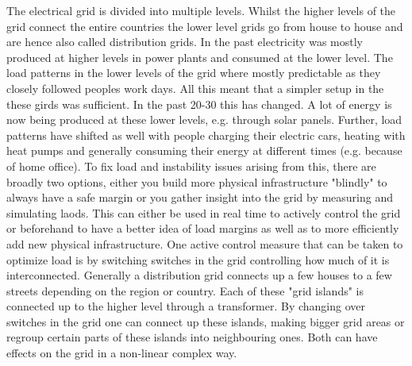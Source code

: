 The electrical grid is divided into multiple levels. Whilst the higher levels of the grid connect
the entire countries the lower level grids go from house to house and are hence also called 
distribution grids. In the past electricity was mostly produced at higher levels in power plants
and consumed at the lower level. The load patterns in the lower levels of the grid where
mostly predictable as they closely followed peoples work days. All this meant that a simpler setup
in the these girds was sufficient. In the past 20-30 this has changed. A lot of energy is now
being produced at these lower levels, e.g. through solar panels. Further, load patterns have shifted
as well with people charging their electric cars, heating with heat pumps and generally consuming
their energy at different times (e.g. because of home office)\autocite{venios}.
To fix load and instability issues arising
from this, there are broadly two options, either you build more physical infrastructure "blindly" to always
have a safe margin or you gather insight into the grid by measuring and simulating laods. This can either
be used in real time to actively control the grid or beforehand to have a better idea of load margins as well
as to more efficiently add new physical infrastructure. One active control measure that can be taken
to optimize load is by switching switches in the grid controlling how much of it is interconnected.
Generally a distribution grid connects up a few houses to a few streets depending on the region or country.
Each of these "grid islands" is connected up to the higher level through a transformer. By changing over
switches in the grid one can connect up these islands, making bigger grid areas or regroup certain parts
of these islands into neighbouring ones. Both can have effects on the grid in a non-linear complex way.\\

